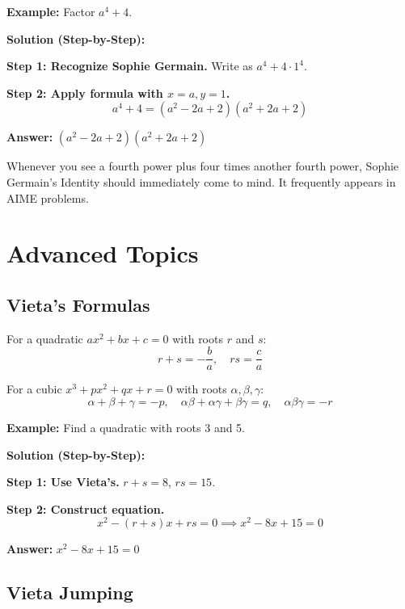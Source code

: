 \documentclass[12pt]{extarticle}
\begin{document}
\begin{examplebox}
\textbf{Example:} Factor $a^4 + 4$.

\textbf{Solution (Step-by-Step):}

\textbf{Step 1: Recognize Sophie Germain.} Write as $a^4 + 4 \cdot 1^4$.

\textbf{Step 2: Apply formula with $x=a, y=1$.}
\[
a^4 + 4 = (a^2 - 2a + 2)(a^2 + 2a + 2)
\]

\textbf{Answer:} $\boxed{(a^2 - 2a + 2)(a^2 + 2a + 2)}$
\end{examplebox}

\begin{remarkbox}
Whenever you see a fourth power plus four times another fourth power, Sophie Germain's Identity should immediately come to mind. It frequently appears in AIME problems.
\end{remarkbox}

\newpage

\section{Advanced Topics}

\subsection{Vieta's Formulas}

For a quadratic $ax^2 + bx + c = 0$ with roots $r$ and $s$:
\[
r + s = -\frac{b}{a}, \quad rs = \frac{c}{a}
\]

For a cubic $x^3 + px^2 + qx + r = 0$ with roots $\alpha, \beta, \gamma$:
\[
\alpha + \beta + \gamma = -p, \quad \alpha\beta + \alpha\gamma + \beta\gamma = q, \quad \alpha\beta\gamma = -r
\]

\begin{examplebox}
\textbf{Example:} Find a quadratic with roots 3 and 5.

\textbf{Solution (Step-by-Step):}

\textbf{Step 1: Use Vieta's.} $r+s = 8$, $rs = 15$.

\textbf{Step 2: Construct equation.}
\[
x^2 - (r+s)x + rs = 0 \implies x^2 - 8x + 15 = 0
\]

\textbf{Answer:} $\boxed{x^2 - 8x + 15 = 0}$
\end{examplebox}

\subsection{Vieta Jumping}
\end{document}
